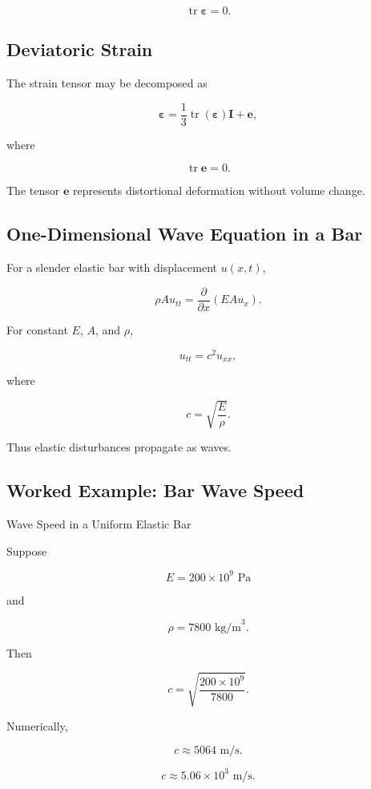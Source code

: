 \[
\boxed{
\operatorname{tr}
\boldsymbol{\varepsilon}=0.
}
\]

\subsection{Deviatoric Strain}
\label{subsec:deviatoric-strain}

The strain tensor may be decomposed as

\[
\boxed{
\boldsymbol{\varepsilon}
=
\frac13
\operatorname{tr}
(\boldsymbol{\varepsilon})
\mathbf{I}
+
\mathbf{e},
}
\]

where

\[
\boxed{
\operatorname{tr}\mathbf{e}=0.
}
\]

The tensor \(\mathbf{e}\) represents distortional deformation without volume
change.

\subsection{One-Dimensional Wave Equation in a Bar}
\label{subsec:bar-wave-equation}

For a slender elastic bar with displacement \(u(x,t)\),

\[
\boxed{
\rho A u_{tt}
=
\frac{\partial}{\partial x}
\left(
EAu_x
\right).
}
\]

For constant \(E\), \(A\), and \(\rho\),

\[
\boxed{
u_{tt}
=
c^2u_{xx},
}
\]

where

\[
\boxed{
c
=
\sqrt{\frac{E}{\rho}}.
}
\]

Thus elastic disturbances propagate as waves.

\subsection{Worked Example: Bar Wave Speed}
\label{subsec:worked-bar-wave-speed}

\begin{workedexamplebox}{Wave Speed in a Uniform Elastic Bar}

Suppose

\[
E=200\times10^9\text{ Pa}
\]

and

\[
\rho=7800\text{ kg/m}^3.
\]

Then

\[
c
=
\sqrt{
\frac{200\times10^9}
{7800}
}.
\]

Numerically,

\[
c
\approx
5064\text{ m/s}.
\]

\begin{answerbox}
\[
\boxed{
c\approx5.06\times10^3\text{ m/s}.
}
\]
\end{answerbox}

\end{workedexamplebox}

